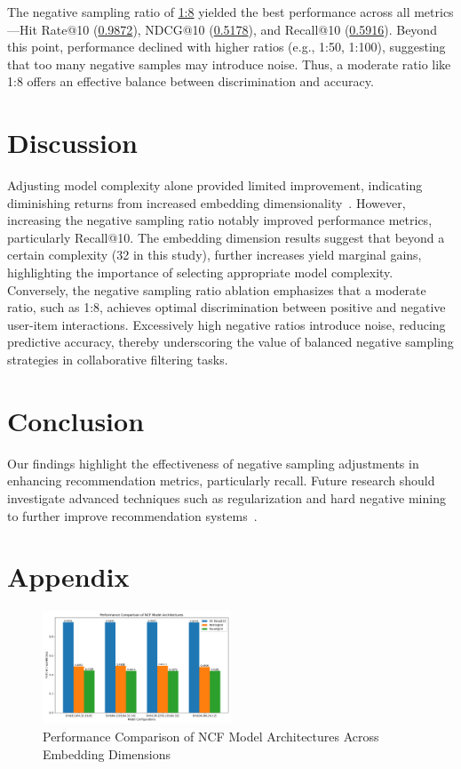 \documentclass[runningheads]{llncs}
\begin{document}
The negative sampling ratio of \underline{1:8} yielded the best performance across all metrics—Hit Rate@10 (\underline{0.9872}), NDCG@10 (\underline{0.5178}), and Recall@10 (\underline{0.5916}). Beyond this point, performance declined with higher ratios (e.g., 1:50, 1:100), suggesting that too many negative samples may introduce noise. Thus, a moderate ratio like 1:8 offers an effective balance between discrimination and accuracy.

\section{Discussion}
Adjusting model complexity alone provided limited improvement, indicating diminishing returns from increased embedding dimensionality~\cite{he2017neural}. However, increasing the negative sampling ratio notably improved performance metrics, particularly Recall@10. The embedding dimension results suggest that beyond a certain complexity (32 in this study), further increases yield marginal gains, highlighting the importance of selecting appropriate model complexity. Conversely, the negative sampling ratio ablation emphasizes that a moderate ratio, such as 1:8, achieves optimal discrimination between positive and negative user-item interactions. Excessively high negative ratios introduce noise, reducing predictive accuracy, thereby underscoring the value of balanced negative sampling strategies in collaborative filtering tasks.

\section{Conclusion}
Our findings highlight the effectiveness of negative sampling adjustments in enhancing recommendation metrics, particularly recall. Future research should investigate advanced techniques such as regularization and hard negative mining to further improve recommendation systems~\cite{rendle2012bpr}.




\appendix

\section*{Appendix}

\begin{figure}[h!]
    \centering
    \includegraphics[width=0.5\textwidth]{model_comparison.png}
    \caption{Performance Comparison of NCF Model Architectures Across Embedding Dimensions}
    \label{fig:model_architectures}
\end{figure}
\end{document}

